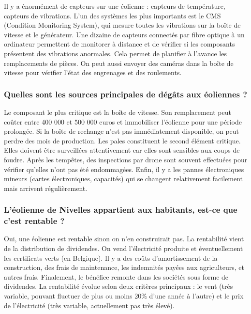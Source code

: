 Il y a énormément de capteurs sur une éolienne : capteurs de température, capteurs de vibrations. L'un des systèmes les plus importants est le CMS (Condition Monitoring System), qui mesure toutes les vibrations sur la boîte de vitesse et le générateur. Une dizaine de capteurs connectés par fibre optique à un ordinateur permettent de monitorer à distance et de vérifier si les composants présentent des vibrations anormales. Cela permet de planifier à l'avance les remplacements de pièces. On peut aussi envoyer des caméras dans la boîte de vitesse pour vérifier l'état des engrenages et des roulements.

\subsubsection{Quelles sont les sources principales de dégâts aux éoliennes ?}

Le composant le plus critique est la boîte de vitesse. Son remplacement peut coûter entre 400 000 et 500 000 euros et immobiliser l'éolienne pour une période prolongée. Si la boîte de rechange n'est pas immédiatement disponible, on peut perdre des mois de production. Les pales constituent le second élément critique. Elles doivent être surveillées attentivement car elles sont sensibles aux coups de foudre. Après les tempêtes, des inspections par drone sont souvent effectuées pour vérifier qu'elles n'ont pas été endommagées. Enfin, il y a les pannes électroniques mineurs (cartes électroniques, capacités) qui se changent relativement facilement mais arrivent régulièrement.

\subsubsection{L'éolienne de Nivelles appartient aux habitants, est-ce que c'est rentable ?}

Oui, une éolienne est rentable sinon on n'en construirait pas. La rentabilité vient de la distribution de dividendes. On vend l'électricité produite et éventuellement les certificats verts (en Belgique). Il y a des coûts d'amortissement de la construction, des frais de maintenance, les indemnités payées aux agriculteurs, et autres frais. Finalement, le bénéfice remonte dans les sociétés sous forme de dividendes. La rentabilité évolue selon deux critères principaux : le vent (très variable, pouvant fluctuer de plus ou moins 20\% d'une année à l'autre) et le prix de l'électricité (très variable, actuellement pas très élevé).

